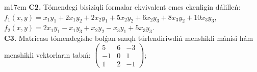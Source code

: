 \documentclass{article}
\begin{document}
\begin{tabular}{m{17cm}}
\textbf{C2.} Tómendegi bisiziqli formalar ekvivalent emes ekenligin dálilleń:\(f_{1}(x,y) = x_{1}y_{1} + 2x_{1}y_{2} + 2x_{2}y_{1} + 5x_{2}y_{2} + 6x_{2}y_{3} + 8x_{3}y_{2} + 10x_{3}y_{3}\), \(f_{2}(x,y) = 2x_{1}y_{1} - x_{1}y_{3} + x_{2}y_{2} - x_{3}y_{1} + 5x_{3}y_{3}\). \\
\textbf{C3.} Matricası tómendegishe bolǵan sızıqlı túrlendiriwdiń menshikli mánisi hám menshikli vektorların tabıń: \(\begin{pmatrix} 5 & 6 & - 3 \\  - 1 & 0 & 1 \\ 1 & 2 & - 1 \end{pmatrix}\); \\

\end{tabular}
\vspace{1cm}
\end{document}
